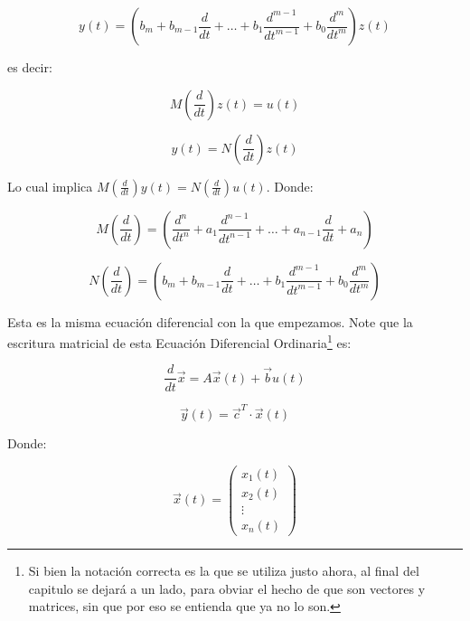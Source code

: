     \begin{equation*}
        y(t) = \left( b_m + b_{m-1} \frac{d}{dt} + \dots + b_1 \frac{d^{m-1}}{dt^{m-1}} + b_0 \frac{d^m}{dt^m} \right) z(t)
    \end{equation*}

    es decir:

    \begin{equation}
        M \left( \frac{d}{dt} \right) z(t) = u(t)
    \end{equation}

    \begin{equation}
        y(t) = N \left( \frac{d}{dt} \right) z(t)
    \end{equation}

    Lo cual implica $M \left( \frac{d}{dt} \right) y(t) = N \left( \frac{d}{dt} \right) u(t)$. Donde:

    \begin{equation*}
        M \left( \frac{d}{dt} \right) = \left( \frac{d^n}{dt^n} + a_1 \frac{d^{n-1}}{dt^{n-1}} + \dots + a_{n-1} \frac{d}{dt} + a_n \right)
    \end{equation*}

    \begin{equation*}
        N \left( \frac{d}{dt} \right) = \left( b_m + b_{m-1} \frac{d}{dt} + \dots + b_1 \frac{d^{m-1}}{dt^{m-1}} + b_0 \frac{d^m}{dt^m} \right)
    \end{equation*}

    Esta es la misma ecuación diferencial con la que empezamos. Note que la escritura matricial de esta Ecuación Diferencial Ordinaria\footnote{Si bien la notación correcta es la que se utiliza justo ahora, al final  del capitulo se dejará a un lado, para obviar el hecho de que son vectores y matrices, sin que por eso se entienda que ya no lo son.} es:

    \begin{equation}
        \frac{d}{dt} \vec{x} = A \vec{x}(t) + \vec{b} u(t)
    \end{equation}

    \begin{equation}
        \vec{y}(t) = \vec{c}^{T} \cdot \vec{x}(t)
    \end{equation}

    Donde:

    \begin{equation}
        \vec{x}(t) =
        \begin{pmatrix}
        x_1(t) \\
        x_2(t) \\
        \vdots \\
        x_n(t)
        \end{pmatrix}
    \end{equation}


